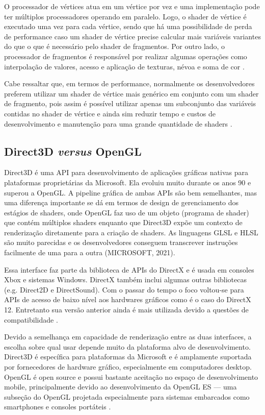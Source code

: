 O processador de vértices atua em um vértice por vez e uma implementação pode ter múltiplos processadores operando em paralelo. Logo, o shader de vértice é executado uma vez para cada vértice, sendo que há uma possibilidade de perda de performance caso um shader de vértice precise calcular mais variáveis variantes do que o que é necessário pelo shader de fragmentos. Por outro lado, o processador de fragmentos é responsável por realizar algumas operações como interpolação de valores, acesso e aplicação de texturas, névoa e soma de cor \cite{GLSLBook}. 

Cabe ressaltar que, em termos de performance, normalmente os desenvolvedores preferem utilizar um shader de vértice mais genérico em conjunto com um shader de fragmento, pois assim é possível utilizar apenas um subconjunto das variáveis contidas no shader de vértice e ainda sim reduzir tempo e custos de desenvolvimento e manutenção para uma grande quantidade de shaders \cite{GLSLBook}.

\subsection{Direct3D \textit{versus} OpenGL}
\label{sec:direct-versus-opengl}

Direct3D é uma API para desenvolvimento de aplicações gráficas nativas para plataformas proprietárias da Microsoft. Ela evoluiu muito durante os anos 90 e superou a OpenGL. A pipeline gráfica de ambas APIs são bem semelhantes, mas uma diferença importante se dá em termos de design de gerenciamento dos estágios de shaders, onde OpenGL faz uso de um objeto (programa de shader) que contém múltiplos shaders enquanto que Direct3D expõe um contexto de renderização diretamente para a criação de shaders. As linguagens GLSL e HLSL são muito parecidas e os desenvolvedores conseguem transcrever instruções facilmente de uma para a outra (MICROSOFT, 2021)\nocite{Direct3D}.

Essa interface faz parte da biblioteca de APIs do DirectX e é usada em consoles Xbox e sistemas Windows. DirectX também inclui algumas outras bibliotecas (e.g. Direct2D e DirectSound). Com o passar do tempo o foco voltou-se para APIs de acesso de baixo nível aos hardwares gráficos como é o caso do DirectX 12. Entretanto sua versão anterior ainda é mais utilizada devido a questões de compatibilidade \cite{hasu2018modern}.

Devido a semelhança em capacidade de renderização entre as duas interfaces, a escolha sobre qual usar depende muito da plataforma alvo de desenvolvimento. Direct3D é específica para plataformas da Microsoft e é amplamente suportada por fornecedores de hardware gráfico, especialmente em computadores desktop. OpenGL é open source e possui bastante aceitação no espaço de desenvolvimento mobile, principalmente devido ao desenvolvimento da OpenGL ES --- uma subseção do OpenGL projetada especialmente para sistemas embarcados como smartphones e consoles portáteis \cite{HLSLBook}.


